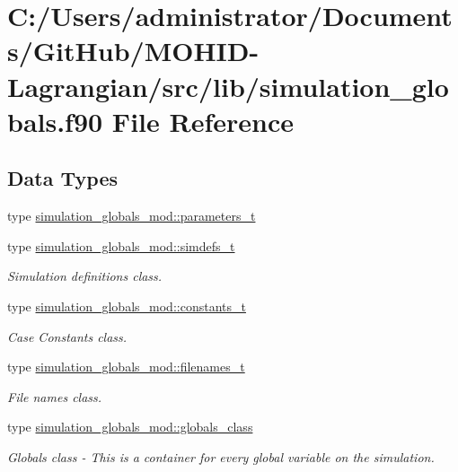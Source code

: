 \hypertarget{simulation__globals_8f90}{}\section{C\+:/\+Users/administrator/\+Documents/\+Git\+Hub/\+M\+O\+H\+I\+D-\/\+Lagrangian/src/lib/simulation\+\_\+globals.f90 File Reference}
\label{simulation__globals_8f90}
\subsection*{Data Types}
\begin{DoxyCompactItemize}
\item 
type \hyperlink{structsimulation__globals__mod_1_1parameters__t}{simulation\+\_\+globals\+\_\+mod\+::parameters\+\_\+t}
\item 
type \hyperlink{structsimulation__globals__mod_1_1simdefs__t}{simulation\+\_\+globals\+\_\+mod\+::simdefs\+\_\+t}
\begin{DoxyCompactList}\small\item\em Simulation definitions class. \end{DoxyCompactList}\item 
type \hyperlink{structsimulation__globals__mod_1_1constants__t}{simulation\+\_\+globals\+\_\+mod\+::constants\+\_\+t}
\begin{DoxyCompactList}\small\item\em Case Constants class. \end{DoxyCompactList}\item 
type \hyperlink{structsimulation__globals__mod_1_1filenames__t}{simulation\+\_\+globals\+\_\+mod\+::filenames\+\_\+t}
\begin{DoxyCompactList}\small\item\em File names class. \end{DoxyCompactList}\item 
type \hyperlink{structsimulation__globals__mod_1_1globals__class}{simulation\+\_\+globals\+\_\+mod\+::globals\+\_\+class}
\begin{DoxyCompactList}\small\item\em Globals class -\/ This is a container for every global variable on the simulation. \end{DoxyCompactList}\end{DoxyCompactItemize}
